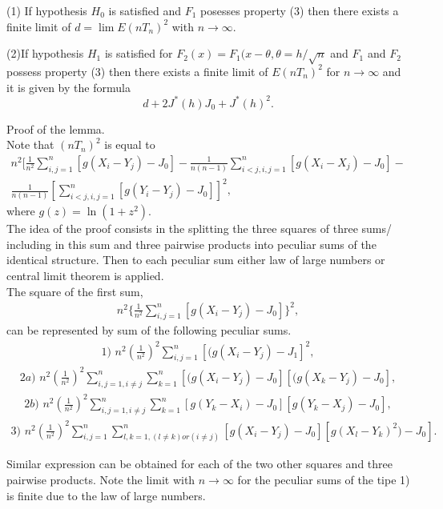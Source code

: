 \documentclass{svproc}
\begin{document}
\begin{lemma}
(1) If hypothesis $H_0$ is satisfied and $F_1$ posesses property (3) then there exists a finite  limit of $d=\lim E(nT_n)^2$ with $n \to \infty.$

(2)If hypothesis $H_1$ is satisfied for $F_2(x)= F_1(x-\theta,\theta= h/\sqrt{n}$ and $F_1$ and $F_2$ possess property (3)  then there exists a finite  limit of $E(nT_n)^2$ for $n \to \infty$ and it is given by the formula
$$
d + 2J^*(h)J_0 + J^*(h)^2.
$$
\end{lemma}
Proof of the lemma.\\
Note that $(nT_n)^2$ is equal to
\begin{eqnarray*}
n^2 [\frac{1}{n^2}\sum_{i,j=1}^n [g(X_i - Y_j)-J_0]-\frac{1}{ n(n-1)}\sum_{i<j,i,j=1}^n  [g(X_i - X_j)-J_0] - \\ \frac{1}{n(n-1)}[\sum_{i<j,i,j=1}^n  [g(Y_i - Y_j)-J_0]]^2,
\end{eqnarray*}
where $g(z)= \ln(1+z^2).$\\
The idea of the proof consists in the splitting the three squares of three sums/ including in this sum and three
pairwise products into peculiar sums of the identical structure.
Then to each peculiar sum either law of large numbers or central limit theorem is applied.\\

The square of the first sum,
\begin{eqnarray*}
n^2 \{\frac{1}{n^2}\sum_{i,j=1}^n [g(X_i - Y_j)-J_0]\}^2,
\end{eqnarray*}
can be represented by sum of the following peculiar sums.
\begin{eqnarray*}
1)\,\,n^2 (\frac{1}{n^2})^2 \sum_{i,j=1}^n [(g(X_i - Y_j) -J_1]^2,
\end{eqnarray*}
\begin{eqnarray*}
2a)\,\,n^2(\frac{1}{n^2})^2 \sum_{i,j=1,i \ne j}^n\sum_{k=1}^n [(g(X_i - Y_j)-J_0][(g(X_k - Y_j)-J_0],
\end{eqnarray*}
\begin{eqnarray*}
2b)\,\,n^2(\frac{1}{n^2})^2 \sum_{i,j=1,i \ne j}^n\sum_{k=1}^n [g(Y_k - X_i)-J_0][g (Y_k - X_j)-J_0],
\end{eqnarray*}
\begin{eqnarray*}
3)\,\, n^2 (\frac{1}{n^2})^2 \sum_{i,j=1}^n\sum_{{l,k=1}, (l \ne  k)or(i\ne j)}^n  [g (X_i - Y_j)-J_0][g(X_l - Y_k)^2)-J_0].
\end{eqnarray*}

Similar expression can be obtained for each of the two other squares and three  pairwise
products.
Note the limit with $n \to \infty$ for the peculiar sums of the tipe 1) is finite due to the law of large numbers.
\end{document}
